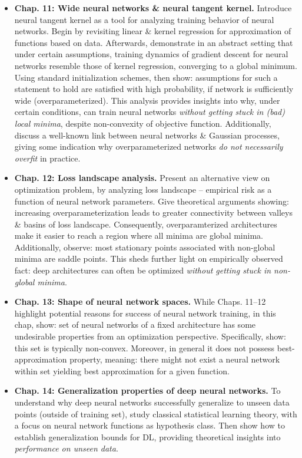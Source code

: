 \documentclass{article}
\begin{document}
\begin{itemize}
\begin{itemize}
\begin{itemize}
			\item {\bf Chap. 11: Wide neural networks \& neural tangent kernel.} Introduce neural tangent kernel as a tool for analyzing training behavior of neural networks. Begin by revisiting linear \& kernel regression for approximation of functions based on data. Afterwards, demonstrate in an abstract setting that under certain assumptions, training dynamics of gradient descent for neural networks resemble those of kernel regression, converging to a global minimum. Using standard initialization schemes, then show: assumptions for such a statement to hold are satisfied with high probability, if network is sufficiently wide (overparameterized). This analysis provides insights into why, under certain conditions, can train neural networks {\it without getting stuck in (bad) local minima}, despite non-convexity of objective function. Additionally, discuss a well-known link between neural networks \& Gaussian processes, giving some indication why overparameterized networks {\it do not necessarily overfit} in practice.
			\item {\bf Chap. 12: Loss landscape analysis.} Present an alternative view on optimization problem, by analyzing loss landscape -- empirical risk as a function of neural network parameters. Give theoretical arguments showing: increasing overparameterization leads to greater connectivity between valleys \& basins of loss landscape. Consequently, overparamterized architectures make it easier to reach a region where all minima are global minima. Additionally, observe: most stationary points associated with non-global minima are saddle points. This sheds further light on empirically observed fact: deep architectures can often be optimized {\it without getting stuck in non-global minima}.
			\item {\bf Chap. 13: Shape of neural network spaces.} While Chaps. 11--12 highlight potential reasons for success of neural network training, in this chap, show: set of neural networks of a fixed architecture has some undesirable properties from an optimization perspective. Specifically, show: this set is typically non-convex. Moreover, in general it does not possess best-approximation property, meaning: there might not exist a neural network within set yielding best approximation for a given function.
			\item {\bf Chap. 14: Generalization properties of deep neural networks.} To understand why deep neural networks successfully generalize to unseen data points (outside of training set), study classical statistical learning theory, with a focus on neural network functions as hypothesis class. Then show how to establish generalization bounds for DL, providing theoretical insights into {\it performance on unseen data}.

\end{itemize}
\end{itemize}
\end{itemize}
\end{document}
